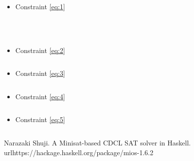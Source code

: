 \documentclass[12pt, a4paper]{article} %
\begin{document}
\begin{itemize}

  \item Constraint \ref{eq:1}
    \begin{listing}[H]
      \inputminted[firstline=275, lastline=279, breaklines]{haskell}{../src/SAT.hs}
      \inputminted[firstline=218, lastline=222, breaklines]{haskell}{../src/SAT.hs}
      \inputminted[firstline=223, lastline=226, breaklines]{haskell}{../src/SAT.hs}
    \end{listing}

    \begin{listing}[H]
      \inputminted[firstline=239, lastline=253, breaklines]{haskell}{../src/SAT.hs}
    \end{listing}

  \item Constraint \ref{eq:2}
    \begin{listing}[H]
      \inputminted[firstline=281, lastline=295, breaklines]{haskell}{../src/SAT.hs}
    \end{listing}

  \newpage

  \item Constraint \ref{eq:3}
    \begin{listing}[H]
      \inputminted[firstline=297, lastline=315, breaklines]{haskell}{../src/SAT.hs}
    \end{listing}

  \item Constraint \ref{eq:4}
    \begin{listing}[H]
      \inputminted[firstline=346, lastline=352, breaklines]{haskell}{../src/SAT.hs}
    \end{listing}

  \newpage

  \item Constraint \ref{eq:5}
    \begin{listing}[H]
      \inputminted[firstline=265, lastline=272, breaklines]{haskell}{../src/SAT.hs}
    \end{listing}

\end{itemize}




\begin{thebibliography}{1}
   Narazaki Shuji. A Minisat-based CDCL SAT solver in Haskell. url{https://hackage.haskell.org/package/mios-1.6.2}
\end{thebibliography}


\end{document}
